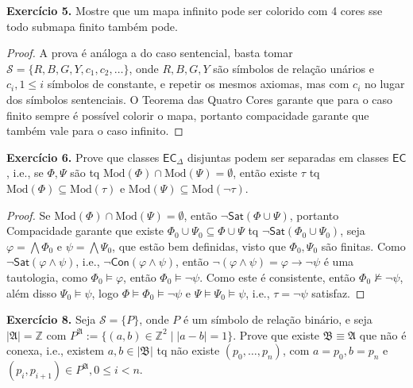 \documentclass[11pt]{article}
\newcommand{\mc}[1]{\mathcal{#1}}
\newcommand{\mf}[1]{\mathfrak{#1}}
\newcommand{\msf}[1]{\mathsf{#1}}
\newcommand{\mbb}[1]{\mathbb{#1}}
\begin{document}
\begin{shaded}
\textbf{Exercício 5.} Mostre que um mapa infinito pode ser colorido com 4 cores sse todo submapa finito também pode.
\end{shaded}

\begin{proof}
    A prova é análoga a do caso sentencial, basta tomar $\mc{S}=\{R, B, G, Y, c_1, c_2,\dots\}$, onde $R,B,G,Y$ são símbolos de relação unários e $c_i,1\leq i$ símbolos de constante, e repetir os mesmos axiomas, mas com $c_i$ no lugar dos símbolos sentenciais. O Teorema das Quatro Cores garante que para o caso finito sempre é possível colorir o mapa, portanto compacidade garante que também vale para o caso infinito.
\end{proof}

\begin{shaded}
\textbf{Exercício 6.} Prove que classes $\msf{EC}_\Delta$ disjuntas podem ser separadas em classes $\msf{EC}$, i.e., se $\Phi,\Psi$ são tq $\text{Mod}(\Phi)\cap\text{Mod}(\Psi)=\emptyset$, então existe $\tau$ tq $\text{Mod}(\Phi)\subseteq\text{Mod}(\tau)$ e $\text{Mod}(\Psi)\subseteq\text{Mod}(\neg\tau)$.
\end{shaded}

\begin{proof}
    Se $\text{Mod}(\Phi)\cap\text{Mod}(\Psi)=\emptyset$, então $\neg\msf{Sat}(\Phi\cup\Psi)$, portanto Compacidade garante que existe $\Phi_0\cup\Psi_0\subseteq\Phi\cup\Psi$ tq $\neg\msf{Sat}(\Phi_0\cup\Psi_0)$, seja $\varphi=\bigwedge\Phi_0$ e $\psi=\bigwedge\Psi_0$, que estão bem definidas, visto que $\Phi_0,\Psi_0$ são finitas. Como $\neg\msf{Sat}(\varphi\wedge\psi)$, i.e., $\neg\msf{Con}(\varphi\wedge\psi)$, então $\neg(\varphi\wedge\psi)=\varphi\to\neg\psi$ é uma tautologia, como $\Phi_0\vDash\varphi$, então $\Phi_0\vDash\neg\psi$. Como este é consistente, então $\Phi_0\nvDash\neg\psi$, além disso $\Psi_0\vDash\psi$, logo $\Phi\vDash\Phi_0\vDash\neg\psi$ e $\Psi\vDash\Psi_0\vDash\psi$, i.e., $\tau=\neg\psi$ satisfaz.
\end{proof}

\begin{shaded}
\textbf{Exercício 8.} Seja $\mc{S}=\{P\}$, onde $P$ é um símbolo de relação binário, e seja $|\mf{A}|=\mbb{Z}$ com $P^\mf{A}:=\{(a,b)\in\mbb{Z}^2\mid |a-b|=1\}$. Prove que existe $\mf{B}\equiv\mf{A}$ que não é conexa, i.e., existem $a,b\in|\mf{B}|$ tq não existe $(p_0,\dots,p_n)$, com $a=p_0,b=p_n$ e $(p_i,p_{i+1})\in P^\mf{A},0\leq i<n$.
\end{shaded}
\end{document}
